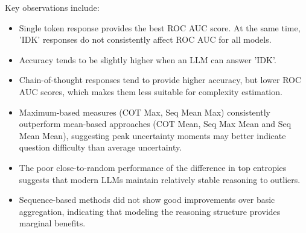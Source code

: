 Key observations include:
\begin{itemize}
    \item Single token response provides the best ROC AUC score. At the same time, 'IDK' responses do not consistently affect ROC AUC for all models.
    \item Accuracy tends to be slightly higher when an LLM can answer 'IDK'.
    \item Chain-of-thought responses tend to provide higher accuracy, but lower ROC AUC scores, which makes them less suitable for complexity estimation.
    \item Maximum-based measures (COT Max, Seq Mean Max) consistently outperform mean-based approaches (COT Mean, Seq Max Mean and Seq Mean Mean), suggesting peak uncertainty moments may better indicate question difficulty than average uncertainty.
    \item The poor close-to-random performance of the difference in top entropies suggests that modern LLMs maintain relatively stable reasoning to outliers.
    \item Sequence-based methods did not show good improvements over basic aggregation, indicating that modeling the reasoning structure provides marginal benefits.
\end{itemize}


